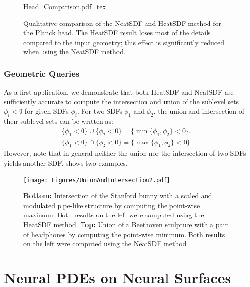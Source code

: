 \documentclass[12pt,openany]{book}
\theoremstyle{plainnormal}
\theoremstyle{remark}
\begin{document}
\begin{figure}
    \centering
    \begingroup
    \sffamily
    \def\svgwidth{0.90\textwidth} %
    {Head_Comparison.pdf_tex}
    \endgroup
    \caption{Qualitative comparison of the NeatSDF and HeatSDF method for the Planck head. The HeatSDF result loses most of the details compared to the input geometry; this effect is significantly reduced when using the NeatSDF method.}
    \label{Head_comp}
\end{figure}
\FloatBarrier

\subsection{Geometric Queries}

As a first application, we demonstrate that both HeatSDF and NeatSDF are sufficiently accurate to compute the intersection and union of the sublevel sets ${\phi_i < 0}$ for given SDFs $\phi_i$. For two SDFs $\phi_1$ and $\phi_2$, the union and intersection of their sublevel sets can be written as:
\begin{align*}
    \{\phi_1 < 0\} \cup \{\phi_2 < 0\} = \{\min\{\phi_1, \phi_2\} < 0\}. \\
    \{\phi_1 < 0\} \cap \{\phi_2 < 0\} = \{\max\{\phi_1, \phi_2\} < 0\}.
\end{align*}
However, note that in general neither the union nor the intersection of two SDFs yields another SDF.  shows two examples.
\begin{figure}
    \centering
    \texttt{[image: Figures/UnionAndIntersection2.pdf]}
    \caption{\textbf{Bottom:} Intersection of the Stanford bunny with a scaled and modulated pipe-like structure by computing the point-wise maximum. Both results on the left were computed using the HeatSDF method. \textbf{Top:} Union of a Beethoven sculpture with a pair of headphones by computing the point-wise minimum. Both results on the left were computed using the NeatSDF method.}\label{intersAndunion}
\end{figure}
\chapter{Neural PDEs on Neural Surfaces}\label{NPDEsonSurfaces} 
\end{document}
